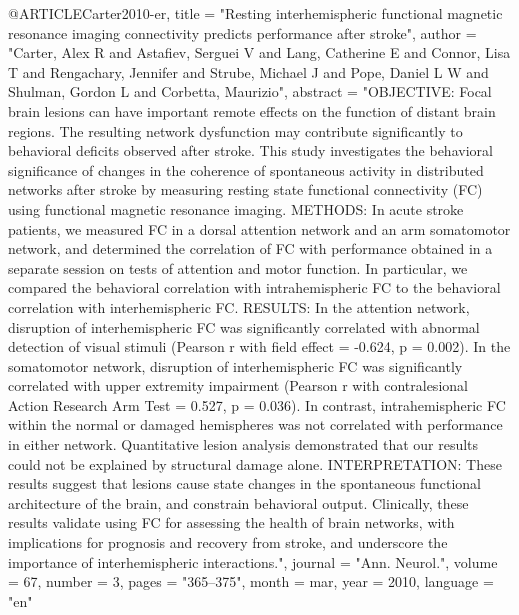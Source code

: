 @ARTICLE{Carter2010-er,
	title    = "Resting interhemispheric functional magnetic resonance imaging
	connectivity predicts performance after stroke",
	author   = "Carter, Alex R and Astafiev, Serguei V and Lang, Catherine E and
	Connor, Lisa T and Rengachary, Jennifer and Strube, Michael J and
	Pope, Daniel L W and Shulman, Gordon L and Corbetta, Maurizio",
	abstract = "OBJECTIVE: Focal brain lesions can have important remote effects
	on the function of distant brain regions. The resulting network
	dysfunction may contribute significantly to behavioral deficits
	observed after stroke. This study investigates the behavioral
	significance of changes in the coherence of spontaneous activity
	in distributed networks after stroke by measuring resting state
	functional connectivity (FC) using functional magnetic resonance
	imaging. METHODS: In acute stroke patients, we measured FC in a
	dorsal attention network and an arm somatomotor network, and
	determined the correlation of FC with performance obtained in a
	separate session on tests of attention and motor function. In
	particular, we compared the behavioral correlation with
	intrahemispheric FC to the behavioral correlation with
	interhemispheric FC. RESULTS: In the attention network,
	disruption of interhemispheric FC was significantly correlated
	with abnormal detection of visual stimuli (Pearson r with field
	effect = -0.624, p = 0.002). In the somatomotor network,
	disruption of interhemispheric FC was significantly correlated
	with upper extremity impairment (Pearson r with contralesional
	Action Research Arm Test = 0.527, p = 0.036). In contrast,
	intrahemispheric FC within the normal or damaged hemispheres was
	not correlated with performance in either network. Quantitative
	lesion analysis demonstrated that our results could not be
	explained by structural damage alone. INTERPRETATION: These
	results suggest that lesions cause state changes in the
	spontaneous functional architecture of the brain, and constrain
	behavioral output. Clinically, these results validate using FC
	for assessing the health of brain networks, with implications for
	prognosis and recovery from stroke, and underscore the importance
	of interhemispheric interactions.",
	journal  = "Ann. Neurol.",
	volume   =  67,
	number   =  3,
	pages    = "365--375",
	month    =  mar,
	year     =  2010,
	language = "en"
}

